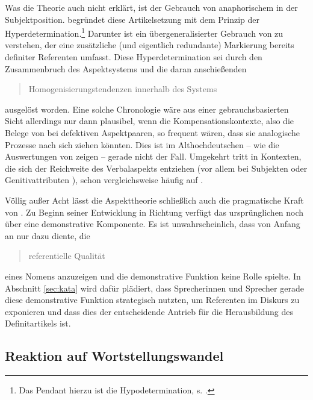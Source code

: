 Was die Theorie auch nicht erklärt, ist der Gebrauch von anaphorischem   in der  Subjektposition. \textcite{Leiss2000,Leiss2010} begründet diese Artikelsetzung mit dem Prinzip der Hyperdetermination.\footnote{Das Pendant hierzu ist die Hypodetermination, s. \textcite{Leiss2000}.} Darunter ist ein übergeneralisierter Gebrauch von  zu verstehen, der eine zusätzliche (und eigentlich redundante) Markierung bereits definiter Referenten umfasst. Diese Hyperdetermination sei durch den Zusammenbruch des Aspektsystems  und die daran anschießenden \blockcquote[196]{Leiss2000}{Homogenisierungstendenzen innerhalb des Systems} ausgelöst worden. Eine solche Chronologie wäre aus einer gebrauchsbasierten Sicht allerdings nur dann plausibel, wenn die Kompensationskontexte, also die Belege von  bei defektiven  Aspektpaaren, so frequent wären, dass sie analogische Prozesse nach sich ziehen könnten. Dies ist im Althochdeutschen -- wie die Auswertungen von \textcite[170--181]{Leiss2000} zeigen -- gerade nicht der Fall. 
Umgekehrt tritt  in Kontexten, die sich der Reichweite des Verbalaspekts  entziehen (vor allem bei Subjekten  oder Genitivattributen ), schon vergleichsweise häufig auf \parencite[s. auch][]{Oubouzar1992}.  

Völlig außer Acht lässt die Aspekttheorie  schließlich auch die pragmatische Kraft von . Zu Beginn seiner Entwicklung in Richtung  verfügt das ursprünglichen  noch über eine demonstrative Komponente. Es ist unwahrscheinlich, dass  von Anfang an nur dazu diente, die \blockcquote[281]{Leiss2000}{referentielle Qualität} eines Nomens anzuzeigen und die demonstrative Funktion keine Rolle spielte. In Abschnitt \ref{sec:kata} wird dafür plädiert, dass Sprecherinnen und Sprecher gerade diese demonstrative Funktion strategisch nutzten, um Referenten im Diskurs zu exponieren und dass dies der entscheidende Antrieb für die Herausbildung des Definitartikels  ist. 

\subsection{Reaktion auf Wortstellungswandel} \label{wortstellungswandel}

